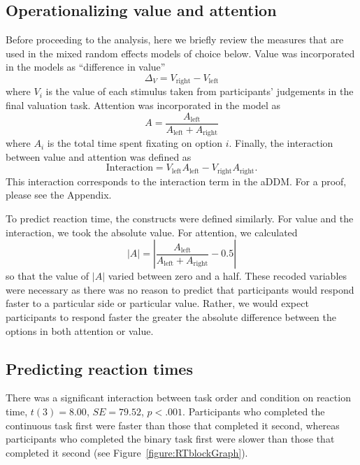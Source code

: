\documentclass[12pt]{article}
\begin{document}
\subsection{Operationalizing value and attention}
Before proceeding to the analysis, here we briefly review the measures that are used in the mixed random effects models of choice below. Value was incorporated in the models as ``difference in value'' 
\begin{equation}
	\Delta_V = V_\text{right} - V_\text{left}	
\end{equation}
where $V_i$ is the value of each stimulus taken from participants' judgements in the final valuation task. Attention was incorporated in the model as 
\begin{equation}
	A = \frac{A_\text{left}}{A_\text{left}+A_\text{right}}
\end{equation}
where $A_i$ is the total time spent fixating on option $i$. Finally, the interaction between value and attention was defined as
\begin{equation}
	\text{Interaction} = V_\text{left} A_\text{left} - V_\text{right} A_\text{right}.
\end{equation}
This interaction corresponds to the interaction term in the aDDM. For a proof, please see the Appendix. 

To predict reaction time, the constructs were defined similarly. For value and the interaction, we took the absolute value. For attention, we calculated
\begin{equation}
	|A| = \left| \frac{A_\text{left}}{A_\text{left}+A_\text{right}} - 0.5 \right| 
\end{equation}
so that the value of $|A|$ varied between zero and a half. These recoded variables were necessary as there was no reason to predict that participants would respond faster to a particular side or particular value. Rather, we would expect participants to respond faster the greater the absolute difference between the options in both attention or value. 

\subsection{Predicting reaction times}
There was a significant interaction between task order and condition on reaction time, $t(3)=8.00$, $SE=79.52$, $p<.001$. Participants who completed the continuous task first were faster than those that completed it second, whereas participants who completed the binary task first were slower than those that completed it second (see Figure~\ref{figure:RTblockGraph}). 
\end{document}
